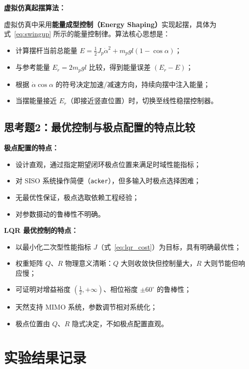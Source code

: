 \documentclass[12pt, a4paper]{article}
\begin{document}
\textbf{虚拟仿真起摆算法：}

虚拟仿真中采用\textbf{能量成型控制（Energy Shaping）}实现起摆，具体为式~\eqref{eq:swingup} 所示的能量控制律。算法核心思想是：
\begin{itemize}
    \item 计算摆杆当前总能量 $E = \frac{1}{2}J_p\dot{\alpha}^2 + m_p g l(1 - \cos\alpha)$；
    \item 与参考能量 $E_r = 2m_p g l$ 比较，得到能量误差 $(E_r - E)$；
    \item 根据 $\dot{\alpha}\cos\alpha$ 的符号决定加速/减速方向，持续向摆中注入能量；
    \item 当摆能量接近 $E_r$（即接近竖直位置）时，切换至线性稳摆控制器。
\end{itemize}

\subsection{思考题2：最优控制与极点配置的特点比较}

\textbf{极点配置的特点：}
\begin{itemize}
    \item 设计直观，通过指定期望闭环极点位置来满足时域性能指标；
    \item 对 SISO 系统操作简便（\texttt{acker}），但多输入时极点选择困难；
    \item 无最优性保证，极点选取依赖工程经验；
    \item 对参数摄动的鲁棒性不明确。
\end{itemize}

\textbf{LQR 最优控制的特点：}
\begin{itemize}
    \item 以最小化二次型性能指标 $J$（式~\eqref{eq:lqr_cost}）为目标，具有明确最优性；
    \item 权重矩阵 $Q$、$R$ 物理意义清晰：$Q$ 大则收敛快但控制量大，$R$ 大则节能但响应慢；
    \item 可证明对增益裕度 $(\frac{1}{2}, +\infty)$、相位裕度 $\pm 60^\circ$ 的鲁棒性；
    \item 天然支持 MIMO 系统，参数调节相对系统化；
    \item 极点位置由 $Q$、$R$ 隐式决定，不如极点配置直观。
\end{itemize}

\section{实验结果记录}
\end{document}
